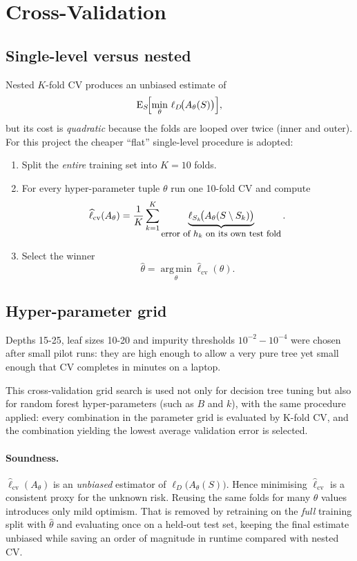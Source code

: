\documentclass[12pt]{report}
\begin{document}
\section{Cross-Validation}

\subsection{Single-level versus nested}\label{sec:cv:why-single}

Nested $K$-fold CV produces an unbiased estimate of
\[
  \mathrm{E}_{S}\!\Bigl[\min_{\theta}
        \,\ell_{D}\!\bigl(A_{\theta}(S)\bigr)\Bigr],
\]
but its cost is \emph{quadratic} because the folds are looped over twice 
(inner and outer). For this project the cheaper “flat” single-level procedure is adopted:

\begin{enumerate}
  \item Split the \emph{entire} training set into $K=10$ folds.
  \item For every hyper-parameter tuple $\theta$ run one 10-fold CV and compute
        \[
          \widehat{\ell}_{\text{cv}}(A_{\theta})=
          \frac{1}{K}\sum_{k=1}^{K}
          \underbrace{\ell_{S_k}\!\bigl(A_{\theta}(S\setminus S_k)\bigr)}_{
          \text{\small error of $h_k$ on its own test fold}}
          .
        \]
  \item Select the winner
        \[
          \hat{\theta}=
          \operatorname*{arg\,min}_{\theta}\widehat{\ell}_{\text{cv}}(\theta).
        \]
\end{enumerate}

\subsection{Hyper-parameter grid}
Depths 15-25, leaf sizes 10-20 and impurity thresholds $10^{-2}\!-\!10^{-4}$ were
chosen after small pilot runs: they are high enough to allow a very pure tree yet
small enough that CV completes in minutes on a laptop.

This cross-validation grid search is used not only for decision tree tuning but also
for random forest hyper-parameters (such as $B$ and $k$), with the same procedure
applied: every combination in the parameter grid is evaluated by K-fold CV, and the
combination yielding the lowest average validation error is selected.

\paragraph{Soundness.}
\(\hat \ell_{\mathrm{cv}}(A_{\theta})\) is an \emph{unbiased} estimator of
\(\ell_D\!\bigl(A_\theta(S)\bigr)\). Hence minimising $\widehat{\ell}_{\text{cv}}$
is a consistent proxy for the unknown risk.  Reusing the same folds for many
$\theta$ values introduces only mild optimism. That is removed by retraining
on the \emph{full} training split with $\hat{\theta}$ and evaluating once on a
held-out test set, keeping the final estimate unbiased while saving an order of
magnitude in runtime compared with nested CV.
\end{document}

